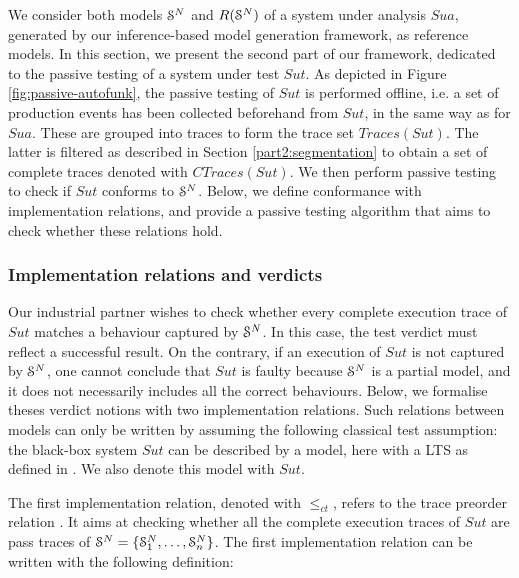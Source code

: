 We consider both models $\EuScript{S}^{N}$ and
$R(\EuScript{S}^{N})$ of a system under analysis $\mathit{Sua}$,
generated by our inference-based model generation framework, as
reference models. In this section, we present the second part of
our framework, dedicated to the passive testing of a system under
test $\mathit{Sut}$. As depicted in Figure
\ref{fig:passive-autofunk}, the passive testing of $\mathit{Sut}$
is performed offline, i.e. a set of production events has been
collected beforehand from $\mathit{Sut}$, in the same way as for
$\mathit{Sua}$. These are grouped into traces to form the trace
set $Traces({Sut})$. The latter is filtered as described in
Section \ref{part2:segmentation} to obtain a set of complete
traces denoted with $CTraces({Sut})$.  We then perform passive
testing to check if $\mathit{Sut}$ conforms to
$\EuScript{S}^{N}$. Below, we define conformance with
implementation relations, and provide a passive testing algorithm
that aims to check whether these relations hold.

\subsubsection{Implementation relations and verdicts}


Our industrial partner wishes to check whether every complete
execution trace of $\mathit{Sut}$ matches a behaviour captured by
$\EuScript{S}^{N}$. In this case, the test verdict must reflect a
successful result. On the contrary, if an execution of $\mathit{Sut}$ is
not captured by $\EuScript{S}^{N}$, one cannot conclude that
$\mathit{Sut}$ is faulty because $\EuScript{S}^{N}$ is a partial model,
and it does not necessarily includes all the correct
behaviours. Below, we formalise theses verdict notions with two
implementation relations. Such relations between models can only be written
by assuming the following classical test assumption: the
black-box system $\mathit{Sut}$ can be described by a model, here
with a LTS as defined in
. We also denote
this model with $\mathit{Sut}$.

The first implementation relation, denoted with $\leq_{ct}$,
refers to the trace preorder relation \cite{DNH84}. It aims at
checking whether all the complete execution traces of
$\mathit{Sut}$ are pass traces of
$\EuScript{S}^{N}=\{\EuScript{S}_1^{N},\dots,\EuScript{S}_n^{N}\}$.
The first implementation relation can be written with the
following definition:

